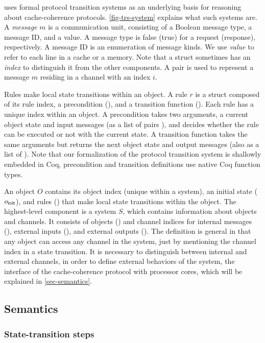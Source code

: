 \hemiola{} uses formal protocol transition systems as an underlying basis for reasoning about cache-coherence protocols.
\autoref{fig-trs-system} explains what such systems are.
A \emph{message} $m$ is a communication unit, consisting of a Boolean message type, a message ID, and a value.
A message type is false (true) for a request (response), respectively.
A message ID is an enumeration of message kinds.
We use \emph{value} to refer to each line in a cache or a memory.
Note that a struct sometimes has an \emph{index} to distinguish it from the other components.
A pair  is used to represent a message $m$ residing in a channel with an index $i$.

Rules make local state transitions within an object.
A rule $r$ is a struct composed of its rule index, a precondition (), and a transition function ().
Each rule has a unique index within an object.
A precondition  takes two arguments, a current object state and input messages (as a list of pairs ), and decides whether the rule can be executed or not with the current state.
A transition function takes the same arguments but returns the next object state and output messages (also as a list of ).
Note that our formalization of the protocol transition system is shallowly embedded in Coq, \eg{} precondition and transition definitions use native Coq function types.

An object $O$ contains its object index (unique within a system), an initial state ($o_{\textsf{init}}$), and rules () that make local state transitions within the object.
The highest-level component is a system $S$, which contains information about objects and channels.
It consists of objects () and channel indices for internal messages (), external inputs (), and external outputs ().
The definition is general in that any object can access any channel in the system, just by mentioning the channel index in a state transition.
It is necessary to distinguish between internal and external channels, in order to define external behaviors of the system, \ie{} the interface of the cache-coherence protocol with processor cores, which will be explained in \autoref{sec-semantics}.

\subsection{Semantics}
\label{sec-semantics}

\subsubsection{State-transition steps}

